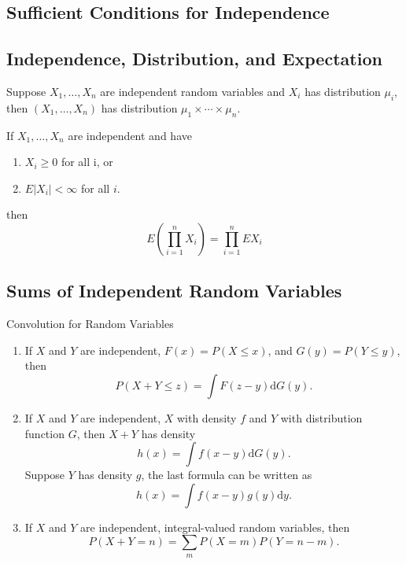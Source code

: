 \subsection{Sufficient Conditions for Independence}

\subsection{Independence, Distribution, and Expectation}

\begin{theorem}{}{}
    Suppose $X_{1},\ldots,X_{n}$ are independent random variables and $X_{i}$ has distribution $\mu_{i}$, then $\left(X_{1},\ldots,X_{n}\right)$ has distribution $\mu_{1}\times\cdots\times\mu_{n}$.
\end{theorem}

\begin{theorem}{}{}
    If $X_{1},\ldots,X_{n}$ are independent and have
    \begin{enumerate}
        \item $X_{i} \geq 0$ for all i, or
        \item $E\left|X_{i}\right|<\infty$ for all $i$.
    \end{enumerate}
    then
    \begin{equation}
        E\left(\prod_{i=1}^{n}X_{i}\right)=\prod_{i=1}^{n}EX_{i}
    \end{equation}
\end{theorem}

\subsection{Sums of Independent Random Variables}

\begin{theorem}{Convolution for Random Variables}{}
    \begin{enumerate}
        \item If $X$ and $Y$ are independent, $F(x)=P(X\leq x)$, and $G(y)=P(Y\leq y)$, then
        \begin{equation}
            P(X+Y\leq z)=\int F(z-y)\mathrm{d}G(y).
        \end{equation}
        \item If $X$ and $Y$ are independent,  $X$ with density $f$ and $Y$ with distribution function $G$, then $X+Y$ has density
        \begin{equation}
            h(x)=\int f(x-y)\mathrm{d}G(y).
        \end{equation}
        Suppose $Y$ has density $g$, the last formula can be written as
        \begin{equation}
            h(x)=\int f(x-y)g(y)\mathrm{d}y.
        \end{equation}
        \item If $X$ and $Y$ are independent, integral-valued random variables, then
        \begin{equation}
            P(X+Y=n)=\sum_{m}P(X=m)P(Y=n-m).
        \end{equation}
    \end{enumerate}
\end{theorem}

